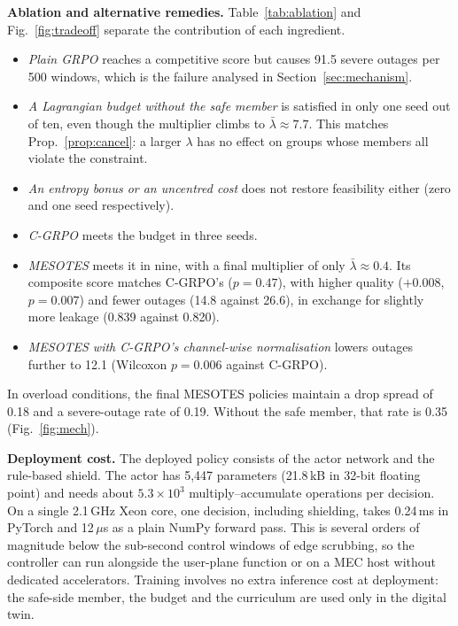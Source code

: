 \documentclass[conference]{IEEEtran}
\begin{document}
\textbf{Ablation and alternative remedies.} Table~\ref{tab:ablation} and Fig.~\ref{fig:tradeoff} separate the contribution of each ingredient.
\begin{itemize}
\item \emph{Plain GRPO} reaches a competitive score but causes 91.5 severe outages per 500 windows, which is the failure analysed in Section~\ref{sec:mechanism}.
\item \emph{A Lagrangian budget without the safe member} is satisfied in only one seed out of ten, even though the multiplier climbs to $\bar\lambda\approx7.7$. This matches Prop.~\ref{prop:cancel}: a larger $\lambda$ has no effect on groups whose members all violate the constraint.
\item \emph{An entropy bonus or an uncentred cost} does not restore feasibility either (zero and one seed respectively).
\item \emph{C-GRPO} meets the budget in three seeds.
\item \emph{MESOTES} meets it in nine, with a final multiplier of only $\bar\lambda\approx0.4$. Its composite score matches C-GRPO's ($p=0.47$), with higher quality ($+0.008$, $p=0.007$) and fewer outages (14.8 against 26.6), in exchange for slightly more leakage (0.839 against 0.820).
\item \emph{MESOTES with C-GRPO's channel-wise normalisation} lowers outages further to 12.1 (Wilcoxon $p=0.006$ against C-GRPO).
\end{itemize}
In overload conditions, the final MESOTES policies maintain a drop spread of 0.18 and a severe-outage rate of 0.19. Without the safe member, that rate is 0.35 (Fig.~\ref{fig:mech}).

\textbf{Deployment cost.} The deployed policy consists of the actor network and the rule-based shield. The actor has 5{,}447 parameters (21.8\,kB in 32-bit floating point) and needs about $5.3\times10^{3}$ multiply--accumulate operations per decision. On a single 2.1\,GHz Xeon core, one decision, including shielding, takes 0.24\,ms in PyTorch and 12\,$\mu$s as a plain NumPy forward pass. This is several orders of magnitude below the sub-second control windows of edge scrubbing, so the controller can run alongside the user-plane function or on a MEC host without dedicated accelerators. Training involves no extra inference cost at deployment: the safe-side member, the budget and the curriculum are used only in the digital twin.
\end{document}
